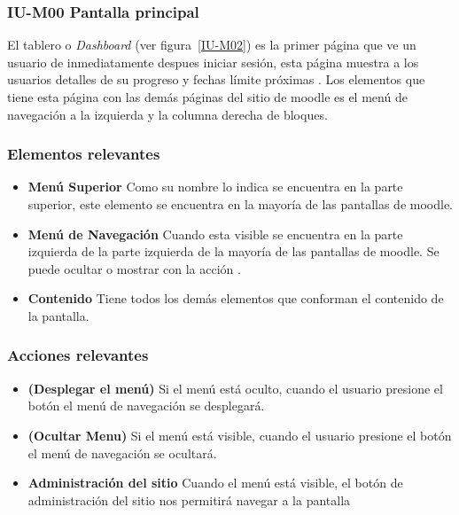 
\subsubsection{IU-M00 Pantalla principal}

 El tablero o {\it Dashboard} (ver figura~\ref{IU-M02}) es la primer página que ve un usuario de
 inmediatamente despues iniciar sesión, esta página muestra a los usuarios detalles de su progreso
 y fechas límite próximas \cite{MoodleTablero} . Los elementos que tiene esta página con las demás
 páginas del sitio de moodle es el menú de navegación a la izquierda y la columna derecha de
 bloques.


\subsubsection{Elementos relevantes}

    \begin{itemize}
    \item
    {\bf Menú Superior}
        Como su nombre lo indica se encuentra en la parte superior, este elemento se
        encuentra en la mayoría de las pantallas de moodle.

    \item
    {\bf Menú de Navegación}
        Cuando esta visible se encuentra en la parte izquierda de la parte izquierda
        de la mayoría de las pantallas de moodle. Se puede ocultar o mostrar con la
        acción \IUMenu[].

    \item
    {\bf Contenido}
        Tiene todos los demás elementos que conforman el contenido de la pantalla.

    \end{itemize}

\subsubsection{Acciones relevantes}

    \begin{itemize}
    
    \item
    {\bf \IUMenu{} (Desplegar el menú)}
        Si el menú está oculto, cuando el usuario presione el botón \IUMenu{} el menú de
        navegación se desplegará.

    \item {\bf \IUMenu{} (Ocultar Menu)}
        Si el menú está visible, cuando el usuario presione el botón \IUMenu{} el menú de
        navegación se ocultará.

    \item {\bf \IUAdminSitio{} Administración del sitio }
        Cuando el menú está visible, el botón de administración del sitio nos permitirá
        navegar a la pantalla 

    \end{itemize}
